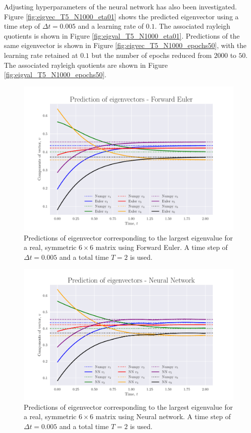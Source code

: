 \documentclass[12pt]{extarticle}
\begin{document}
Adjusting hyperparameters of the neural network has also been investigated. Figure \ref{fig:eigvec_T5_N1000_eta01} shows the predicted eigenvector using a time step of $\Delta t = 0.005$ and a learning rate of $0.1$. The associated rayleigh quotients is shown in Figure \ref{fig:eigval_T5_N1000_eta01}. Predictions of the same eigenvector is shown in Figure \ref{fig:eigvec_T5_N1000_epochs50}, with the learning rate retained at $0.1$ but the number of epochs reduced from $2000$ to $50$. The associated rayleigh quotients are shown in Figure \ref{fig:eigval_T5_N1000_epochs50}.

\begin{figure}[h]
	\centering
	\includegraphics[scale=0.6]{../output/plots/FE_eigvec_T2_N1000_dim6.pdf}
	\caption{Predictions of eigenvector corresponding to the largest eigenvalue for a real, symmetric $6\times 6$ matrix using Forward Euler. A time step of $\Delta t = 0.005$ and a total time $T=2$ is used.}
	\label{fig:FE_eigvec_T2_N1000_dim6}
\end{figure}

\begin{figure}[h]
	\centering
	\includegraphics[scale=0.6]{../output/plots/NN_eigvec_T2_N1000_dim6.pdf}
	\caption{Predictions of eigenvector corresponding to the largest eigenvalue for a real, symmetric $6\times 6$ matrix using Neural network. A time step of $\Delta t = 0.005$ and a total time $T=2$ is used.}
	\label{fig:NN_eigvec_T2_N1000_dim6}
\end{figure}
\end{document}
